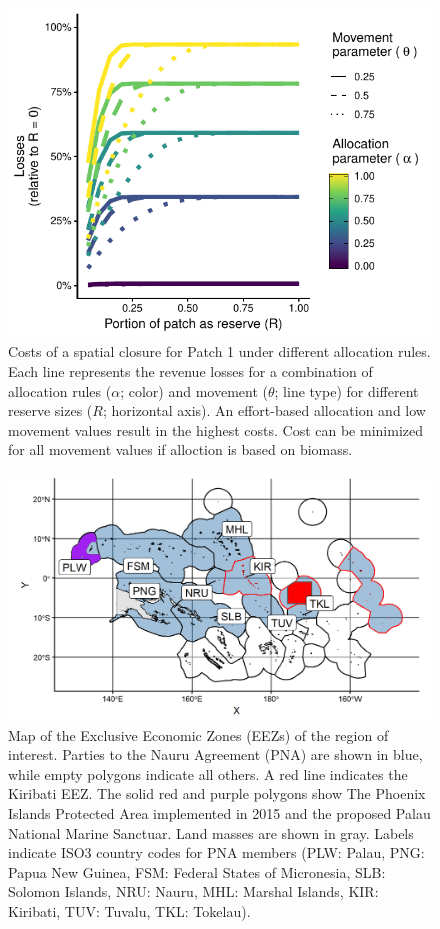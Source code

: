 \documentclass[12pt]{article}
\begin{document}
\begin{figure}[htbp]
\centering
\includegraphics{img/allocation_cost_plot.pdf}
\caption{\label{fig:allocation_cost_plot}Costs of a spatial closure for Patch 1 under different allocation rules. Each line represents the revenue losses for a combination of allocation rules ($\alpha$; color) and movement ($\theta$; line type) for different reserve sizes ($R$; horizontal axis). An effort-based allocation and low movement values result in the highest costs. Cost can be minimized for all movement values if alloction is based on biomass.}
\end{figure}

\begin{figure}
\centering
\includegraphics{img/PNA_map.png}
\caption{\label{fig:PNA_map}Map of the Exclusive Economic Zones (EEZs) of the region of interest. Parties to the Nauru Agreement (PNA) are shown in blue, while empty polygons indicate all others. A red line indicates the Kiribati EEZ. The solid red and purple polygons show The Phoenix Islands Protected Area implemented in 2015 and the proposed Palau National Marine Sanctuar. Land masses are shown in gray. Labels indicate ISO3 country codes for PNA members (PLW: Palau, PNG: Papua New Guinea, FSM: Federal States of Micronesia, SLB: Solomon Islands, NRU: Nauru, MHL: Marshal Islands, KIR: Kiribati, TUV: Tuvalu, TKL: Tokelau).}
\end{figure}
\end{document}
